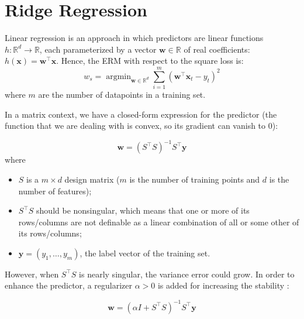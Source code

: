 \documentclass{article}
\DeclareMathOperator*{\argmin}{argmin}
\begin{document}
\section{Ridge Regression}
Linear regression is an approach in which predictors are linear functions $h: \mathbb{R}^d \rightarrow \mathbb{R}$, each parameterized by a vector $\boldsymbol{w} \in \mathbb{R}$ of real coefficients: $h(\boldsymbol{x}) = \boldsymbol{w}^\top\boldsymbol{x}$. Hence, the ERM with respect to the square loss is: \begin{equation}
w_s = \argmin_{\boldsymbol{w} \in \mathbb{R}^d}\sum_{i = 1}^m(\boldsymbol{w}^\top \boldsymbol{x}_t - y_t)^2
\end{equation}
where $m$ are the number of datapoints in a training set.
    
In a matrix context, we have a closed-form expression for the predictor (the function that we are dealing with is convex, so its gradient can vanish to $0$):
    
\begin{equation}
	\boldsymbol{w} = (S^\top S)^{-1}S^\top \boldsymbol{y}
\end{equation}
where 
\begin{itemize}
	\item $S$ is a $m \times d$ design matrix ($m$ is the number of training points and $d$ is the number of features);
	\item $S^\top S$ should be nonsingular, which means that one or more of its rows/columns are not definable as a linear combination of all or some other of its rows/columns;
	\item $\boldsymbol{y} = (y_1, \dots , y_m)$, the label vector of the training set.
\end{itemize}
    
However, when $S^\top S$ is nearly singular, the variance error could grow. In order to enhance the predictor, a regularizer $\alpha > 0$ is added for increasing the stability \cite{profrr}:

\begin{equation}
\label{rr}
	\boldsymbol{w} = (\alpha I + S^\top S)^{-1}S^\top \boldsymbol{y}
\end{equation}

\end{document}
